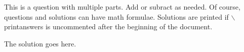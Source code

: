 \begin{center}
  \gradetable[h][questions]
\end{center}
\vspace{0.2in}


\begin{questions}

\question \label{ques:questionparts}
This is a question with multiple parts. Add or subract as needed. Of course, questions and solutions can have math formulae. Solutions are printed if \textsf{$\backslash$printanswers} is uncommented after the beginning of the document.

\droptotalpoints


\begin{solution}
The solution goes here.
\end{solution}



\end{questions}
